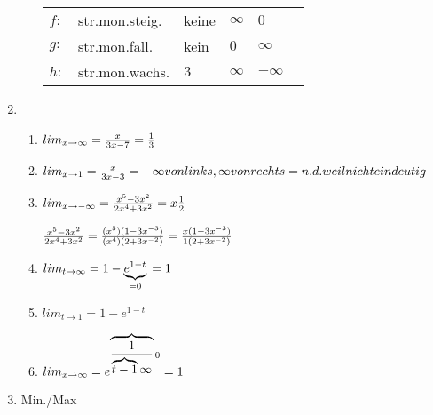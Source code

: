 \documentclass[12pt,a4paper]{scrreprt}
\begin{document}
\begin{enumerate}
\begin{enumerate}
\begin{tabular}{llllll}
$f:$					&str.mon.steig.	&keine			&$\infty$				&$0$				\\
$g:$					&str.mon.fall.	&kein			&$0$					&$\infty$			\\
$h:$					&str.mon.wachs.	&$3$			&$\infty$				&$-\infty$
\end{tabular}

\end{enumerate}

\item

\begin{enumerate}

\item
$lim_{x \rightarrow \infty} = \frac{x}{3x-7}	\\
=\frac{1}{3}$

\item
$lim_{x \rightarrow 1} = \frac{x}{3x-3}	\\
=-\infty von links, \infty von rechts	\\
= n.d. weil nicht eindeutig$

\item
$lim_{x \rightarrow -\infty} = \frac{x^5-3x^2}{2x^4+3x^2}	\\
= x \frac{1}{2}$

$  \frac{x^5-3x^2}{2x^4+3x^2}	\\
= \frac{(x^5)(1-3x^{-3})}{(x^4)(2+3x^{-2})}	\\
= \frac{x(1-3x^{-3})}{1(2+3x^{-2})}$


\item
$lim_{t \rightarrow \infty} = 1-\underbrace{e^{1-t}}_{=0}	\\
=1$


\item
$lim_{t \rightarrow 1} = 1 - e^{1-t}	$



\item
$lim_{x \rightarrow \infty} = e^{\overbrace{\frac{1}{\overbrace{t-1}{\infty}}}{0}}	\\
=1$

\end{enumerate}

\item
Min./Max

\begin{enumerate}


\end{enumerate}
\end{enumerate}
\end{document}
